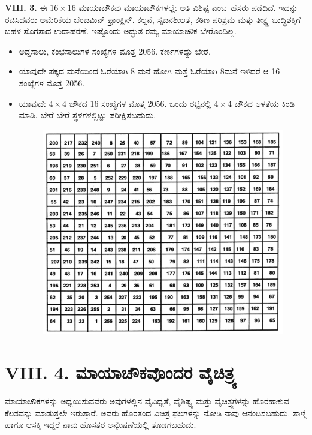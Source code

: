 \noindent \textbf{VIII. 3.} ಈ $16 \times 16$ ಮಾಯಾಚೌಕವು ಮಾಯಾಚೌಕಗಳಲ್ಲೇ ಅತಿ ವಿಶಿಷ್ಟ \hbox{ಎಂಬ ಹೆಸರು} ಪಡೆದಿದೆ. ಇದನ್ನು ರಚಿಸಿದವರು ಅಮೆರಿಕೆಯ ಬೆಂಜಮಿನ್ ಫ್ರಾಂಕ್ಲಿನ್. ಕಲ್ಪನೆ, \hbox{ಸೃಜನಶೀಲತೆ,} ಕಠಿಣ ಪರಿಶ್ರಮ ಮತ್ತು ತೀಕ್ಷ್ಣ ಬುದ್ಧಿಶಕ್ತಿಗೆ ಬಹಳ ಸೊಗಸಾದ ಉದಾಹರಣೆ. ಇಷ್ಟೊಂದು ಅದ್ಭುತ ರಮ್ಯ ಮಾಯಾಚೌಕ ಬೇರೊಂದಿಲ್ಲ.

\begin{itemize}
	\item ಅಡ್ಡಸಾಲು, ಕಂಭಸಾಲುಗಳ ಸಂಖ್ಯೆಗಳ ಮೊತ್ತ 2056. ಕರ್ಣಗಳದ್ದು ಬೇರೆ.\smallskip
	\item ಯಾವುದೇ ಪಕ್ಕದ ಮನೆಯಿಂದ ಓರೆಯಾಗಿ 8 ಮನೆ ಹೋಗಿ ಮತ್ತೆ ಓರೆಯಾಗಿ 8ಮನೆ ಇಳಿದರೆ ಆ 16 ಸಂಖ್ಯೆಗಳ ಮೊತ್ತ 2056.\smallskip
	\item ಯಾವುದೇ $4 \times 4$ ಚೌಕದ 16 ಸಂಖ್ಯೆಗಳ ಮೊತ್ತ 2056. ಒಂದು ರಟ್ಟಿನಲ್ಲಿ $4 \times 4$ ಚೌಕದ ಅಳತೆಯ ಕಿಂಡಿ ಮಾಡಿ. ಬೇರೆ ಬೇರೆ ಸ್ಥಳಗಳಲ್ಲಿಟ್ಟು ಪರೀಕ್ಷಿಸಬಹುದು.
	\begin{figure}[H]
	\includegraphics{src/figures/chap7/fig7-7.jpg}
	\end{figure}
\end{itemize}

\section*{VIII. 4. ಮಾಯಾಚೌಕವೊಂದರ ವೈಚಿತ್ರ್ಯ}

ಮಾಯಾಚೌಕಗಳನ್ನು ಅಧ್ಯಯಿಸುವವರು ಅವುಗಳಲ್ಲಿನ ವೈವಿಧ್ಯತೆ, ವೈಶಿಷ್ಟ್ಯ ಮತ್ತು ವೈಚಿತ್ರ್ಯಗಳನ್ನು ಹೊರಹಾಕುವ ಕೆಲಸವನ್ನು ಮಾಡುತ್ತಲೇ ಇರುತ್ತಾರೆ. ಅವರು ಹೊರತಂದ ವಿಚಿತ್ರ ಫಲಗಳನ್ನು ನೋಡಿ ನಾವು ಆನಂದಿಸಬಹುದು. ತಾಳ್ಮೆ ಹಾಗೂ ಆಸಕ್ತಿ ಇದ್ದರೆ ನಾವು ಹೊಸತರ ಅನ್ವೇಷಣೆಯಲ್ಲಿ ತೊಡಗಬಹುದು.

